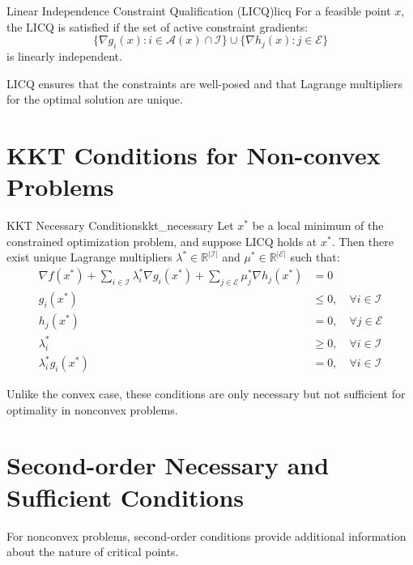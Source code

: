 \begin{definition}{Linear Independence Constraint Qualification (LICQ)}{licq}
    For a feasible point $x$, the LICQ is satisfied if the set of active constraint gradients:
    \[
    \{\nabla g_i(x) : i \in \mathcal{A}(x) \cap \mathcal{I}\} \cup \{\nabla h_j(x) : j \in \mathcal{E}\}
    \]
    is linearly independent.
\end{definition}

LICQ ensures that the constraints are well-posed and that Lagrange multipliers for the optimal solution are unique.

\section{KKT Conditions for Non-convex Problems}

\begin{theorem}{KKT Necessary Conditions}{kkt_necessary}
    Let $x^*$ be a local minimum of the constrained optimization problem, and suppose LICQ holds at $x^*$. Then there exist unique Lagrange multipliers $\lambda^* \in \mathbb{R}^{|\mathcal{I}|}$ and $\mu^* \in \mathbb{R}^{|\mathcal{E}|}$ such that:
    \begin{align}
        \nabla f(x^*) + \sum_{i \in \mathcal{I}} \lambda_i^* \nabla g_i(x^*) + \sum_{j \in \mathcal{E}} \mu_j^* \nabla h_j(x^*) &= 0 \tag{Stationarity}\\
        g_i(x^*) &\leq 0, \quad \forall i \in \mathcal{I} \tag{Primal Feasibility}\\
        h_j(x^*) &= 0, \quad \forall j \in \mathcal{E} \tag{Primal Feasibility}\\
        \lambda_i^* &\geq 0, \quad \forall i \in \mathcal{I} \tag{Dual Feasibility}\\
        \lambda_i^* g_i(x^*) &= 0, \quad \forall i \in \mathcal{I} \tag{Complementary Slackness}
    \end{align}
\end{theorem}

Unlike the convex case, these conditions are only necessary but not sufficient for optimality in nonconvex problems.

\section{Second-order Necessary and Sufficient Conditions}

For nonconvex problems, second-order conditions provide additional information about the nature of critical points.

